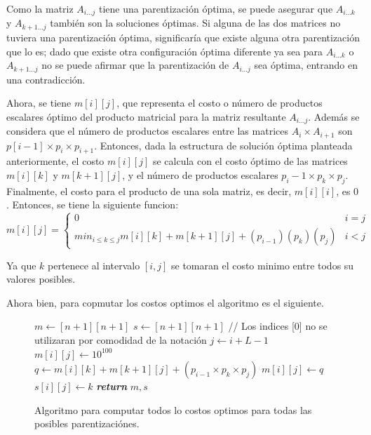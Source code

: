 \documentclass[12pt,twoside]{article}
\begin{document}
Como la matriz $A_{i\dots j}$ tiene una parentizaci\'on \'optima, se puede asegurar que  $A_{i \dots k}$ y $A_{k+1 \dots j}$ tambi\'en son la soluciones \'optimas. Si alguna de las dos matrices no tuviera una parentizaci\'on \'optima, significar\'ia que existe alguna otra parentizaci\'on que lo es; dado que existe otra configuraci\'on \'optima diferente ya sea para  $A_{i \dots k}$ o $A_{k+1 \dots j}$ no se puede afirmar que la parentizaci\'on de $A_{i\dots j}$ sea \'optima, entrando en una contradicci\'on.

Ahora, se tiene $m[i][j]$, que representa el costo o n\'umero de productos escalares \'optimo del producto matricial para la matriz resultante $A_{i \dots j}$. Adem\'as se considera que el n\'umero de productos escalares entre las matrices $A_i \times A_{i+1}$ son $p[i-1] \times p_i \times p_{i+1}$. Entonces, dada la estructura de soluci\'on \'optima planteada anteriormente, el costo $m[i][j]$ se calcula con el costo \'optimo de las matrices $m[i][k]$ y $m[k+1][j]$, y el n\'umero de productos escalares $p_i-1 \times p_k \times p_j$. Finalmente, el costo para el producto de una sola matriz, es decir, $m[i][i]$, es $0$. Entonces, se tiene la siguiente funcion:
\[
    m[i][j] =
    \begin{cases}
        0 & i = j \\
        min_{i \leq k \leq j}{ m[i][k] + m[k+1][j] + (p_{i-1})(p_k)(p_j) } & i < j
    \end{cases}
\]

Ya que $k$ pertenece al intervalo $[i,j]$ se tomaran el costo minimo entre todos su valores posibles.

Ahora bien, para copmutar los costos optimos el algoritmo es el siguiente.

\begin{figure}[ht]
    \centering
    \begin{algorithmic}
            \State $m \longleftarrow [n+1][n+1]$
            \State $s \longleftarrow [n+1][n+1]$
            \State // Los indices [0] no se utilizaran por comodidad de la notaci\'on
                    \State $j \longleftarrow i + L - 1$
                    \State $m[i][j] \longleftarrow 10^{100}$
                        \State $q \longleftarrow m[i][k] + m[k+1][j] + (p_{i-1} \times p_k \times p_j)$
                            \State $m[i][j] \longleftarrow q$
                            \State $s[i][j] \longleftarrow k$
                        \EndIf
                    \EndFor
                \EndFor
            \EndFor
            \State \textit{\textbf{return}} $m,s$
        \EndProcedure
    \end{algorithmic}
    \caption{Algoritmo para computar todos lo costos optimos para todas las posibles parentizaci\'ones.}
    \label{fig:computo_costos}
\end{figure}
\end{document}
